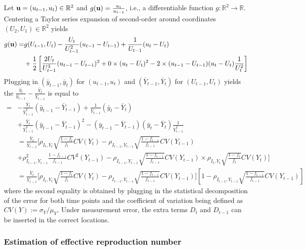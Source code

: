 \documentclass[12pt]{article}
\begin{document}
Let ${\bf u} = (u_{t-1},u_t) \in \mathbb{R}^2$ and $g({\bf u}) = \frac{u_t}{u_{t-1}}$, i.e., a differentiable function $g:\mathbb{R}^2 \to \mathbb{R}$. Centering a Taylor series expansion of second-order around coordinates $(U_2, U_1) \in \mathbb{R}^2$ yields
$$
\begin{aligned}
g({\bf u}) =& g(U_{t-1}, U_t) - \frac{U_t}{U_{t-1}^2} (u_{t-1} - U_{t-1}) + \frac{1}{U_{t-1}} (u_t - U_t) \\
&+ \frac{1}{2} \left[ \frac{2 U_t}{U_{t-1}^3} (u_{t-1} - U_{t-1})^2 + 0 \times (u_t - U_t)^2 - 2 \times (u_{t-1} - U_{t-1}) (u_t - U_t) \frac{1}{U_t^2} \right]
\end{aligned}
$$
Plugging in $(\bar y_{t-1}, \bar y_t)$ for $(u_{t-1}, u_t)$ and $(\bar Y_{t-1}, \bar Y_t)$ for $(U_{t-1}, U_t)$ yields the $\frac{\bar y_t}{\bar y_{t-1}} - \frac{\bar Y_t}{\bar Y_{t-1}} $ is equal to
$$
\begin{aligned}
=&
- \frac{\bar Y_t}{\bar Y_{t-1}^2} (\bar y_{t-1} - \bar Y_{t-1}) + \frac{1}{\bar Y_{t-1}} (\bar y_t - \bar Y_t) \\
&+ \frac{\bar Y_t}{\bar Y_{t-1}^3} (\bar y_{t-1} - \bar Y_{t-1})^2 -  (\bar y_{t-1} - \bar Y_{t-1}) (\bar y_t - \bar Y_t) \frac{1}{\bar Y_{t-1}^2} \\
&= \frac{\bar Y_t}{\bar Y_{t-1}} \bigg[  \rho_{I_t,Y_t} \sqrt{\frac{1-f_t}{f_t}} CV (Y_t)  -\rho_{I_{t-1},Y_{t-1}} \sqrt{\frac{1-f_{t-1}}{f_{t-1}}} CV (Y_{t-1}) \\
&+ \rho^2_{I_{t-1},Y_{t-1}} \frac{1-f_{t-1}}{f_{t-1}} CV^2 (Y_{t-1}) -  \rho_{I_{t-1},Y_{t-1}} \sqrt{\frac{1-f_{t-1}}{f_{t-1}}} CV (Y_{t-1}) \times
\rho_{I_t,Y_t} \sqrt{\frac{1-f_t}{f_t}} CV (Y_t)   \bigg] \\
&= \frac{\bar Y_t}{\bar Y_{t-1}} \bigg[ \rho_{I_t,Y_t} \sqrt{\frac{1-f_t}{f_t}} CV (Y_t)  -\rho_{I_{t-1},Y_{t-1}} \sqrt{\frac{1-f_{t-1}}{f_{t-1}}} CV (Y_{t-1}) \bigg] \left[ 1 - \rho_{I_{t-1},Y_{t-1}} \sqrt{\frac{1-f_{t-1}}{f_{t-1}}} CV (Y_{t-1}) \right]
\end{aligned}
$$
where the second equality is obtained by plugging in the statistical decomposition of the error for both time points and the coefficient of variation being defined as $CV(Y) := \sigma_Y/\mu_Y$.  Under measurement error, the extra terms $D_{t}$ and $D_{t-1}$ can be inserted in the correct locations.

\subsubsection*{Estimation of effective reproduction number}
\end{document}
